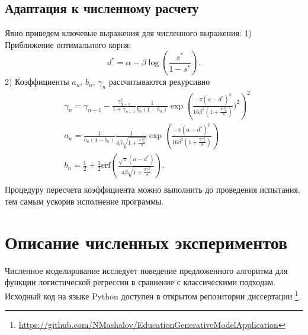 \documentclass{mipt-thesis-bs}
\begin{document}
\subsection{Адаптация к численному расчету}
Явно приведем ключевые выражения для численного выражения:
1) Приближение оптимального корня:
\begin{equation}
    d^* = \alpha  - \beta \log\left(\frac{s^*}{1-s^*}\right).
\end{equation}
2) Коэффициенты $a_n$, $b_n$, $\gamma_n$ рассчитываются рекурсивно
\begin{equation}
    \begin{aligned}
        &\gamma_n = \gamma_{n-1} - \frac{\gamma_{n-1}^2}{1+\gamma_{n-1}} \frac{1}{b_n(1-b_n)}
    \exp\left(\frac{- \pi (\alpha-d^*)^2}{16  \beta^2 ( 1+\frac{\pi\gamma_n^2}{8})})^2\right)^2 \\
        &a_n = \frac{1}{b_n(1-b_n)} \frac{1}{4  \beta \sqrt{1+\frac{\pi\gamma_n^2}{8}}} \exp\left( \frac{- \pi (\alpha-d^*)^2}{16  \beta^2 ( 1+\frac{\pi\gamma_n^2}{8})}\right)  \\
        &b_n = \frac{1}{2} + \frac{1}{2} \text{erf}\left(\frac{\sqrt{\pi} (\alpha-d^*)}{4 \beta \sqrt{1+\frac{\pi\gamma_n^2}{8}}} \right).\\  
    \end{aligned}
\end{equation}
Процедуру пересчета коэффициента можно выполнить до проведения испытания, тем самым ускорив исполнение программы.

\section{Описание численных экспериментов}
Численное моделирование исследует поведение предложенного алгоритма для функции логистической регрессии в сравнение с классическими подходам.
Исходный код на языке Python доступен в открытом репозитории диссертации
\footnote{\url{https://github.com/NMashalov/EducationGenerativeModelApplication}}.
\end{document}
